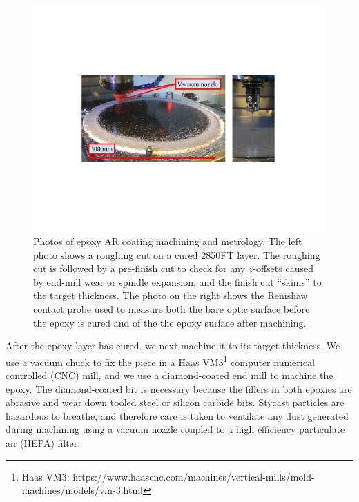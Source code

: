 \begin{figure}[!t]
    \centering
    \includegraphics[width=\linewidth, trim=4cm 6.5cm 4cm 6.5cm, clip]{ARCoating/Figures/epoxy_machining.pdf}
    \caption[Photos of epoxy AR coating machining and metrology.]{Photos of epoxy AR coating machining and metrology. The left photo shows a roughing cut on a cured 2850FT layer. The roughing cut is followed by a pre-finish cut to check for any $z$-offsets caused by end-mill wear or spindle expansion, and the finish cut ``skims'' to the target thickness. The photo on the right shows the Renishaw contact probe used to measure both the bare optic surface before the epoxy is cured and of the the epoxy surface after machining.}
    \label{fig:epoxy_machining}
\end{figure}

After the epoxy layer has cured, we next machine it to its target thickness. We use a vacuum chuck to fix the piece in a Haas VM3\footnote{Haas VM3: https://www.haascnc.com/machines/vertical-mills/mold-machines/models/vm-3.html} computer numerical controlled (CNC) mill, and we use a diamond-coated end mill to machine the epoxy. The diamond-coated bit is necessary because the fillers in both epoxies are abrasive and wear down tooled steel or silicon carbide bits. Stycast particles are hazardous to breathe, and therefore care is taken to ventilate any dust generated during machining using a vacuum nozzle coupled to a high efficiency particulate air (HEPA) filter. 

